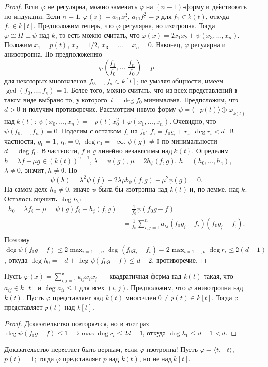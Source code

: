 \documentclass[a4paper,oneside,12pt]{article}
\theoremstyle{plain} { \swapnumbers
\newtheorem{theorem}{Теорема}[subsection]
\newtheorem{corollary}[theorem]{Следствие}
\newtheorem{lemma}[theorem]{Лемма}
\newtheorem{proposition}[theorem]{Утверждение}
\newtheorem{claim}[theorem]{Факт}
}
\theoremstyle{definition} { \swapnumbers
\newtheorem{definition}[theorem]{Определение}
\newtheorem{notation}[theorem]{Обозначение}
\newtheorem{remark}[theorem]{Замечание}
\newtheorem{remarks}[theorem]{Замечания}
\newtheorem{example}[theorem]{Пример}
\newtheorem{examples}[theorem]{Примеры}
\newtheorem{sssection}[theorem]{}
}
\def\ph{\varphi}
\def\la{\langle}
\def\ra{\rangle}
\begin{document}
\begin{proof}
Если $\ph$ не регулярна, можно заменить $\ph$ на $(n-1)$-форму и действовать по индукции.
Если $n=1$, $\ph(x)=a_{11}x_1^2$, $a_{11}f_1^2=p$ для $f_1\in k(t)$, откуда $f_1\in k[t]$.
Предположим теперь, что $\ph$ регулярна, но изотропна. Тогда $\ph\cong H\perp\psi$ над $k$,
то есть можно считать, что $\ph(x)=2x_1x_2+\psi(x_3,\dots,x_n)$. Положим $x_1=p(t)$, $x_2=1/2$,
$x_3=\dots=x_n=0$.
Наконец, $\ph$ регулярна и анизотропна. По предположению
$$
\ph\left(\frac{f_1}{f_0},\dots,\frac{f_n}{f_0}\right)=p
$$
для некоторых многочленов $f_0,\dots,f_n\in k[t]$; не умаляя общности, имеем $\gcd(f_0,\dots,f_n)=1$.
Более того, можно считать, что из всех представлений в таком виде выбрано то, у которого
$d=\deg f_0$ минимальна. Предположим, что $d>0$ и получим противоречие.
Рассмотрим новую форму $\psi=\la -p(t)\ra\oplus\ph_{k(t)}$ над $k(t)$:
$\psi(x_0,\dots,x_n)=-p(t)x_0^2+\ph(x_1,\dots,x_n)$. Очевидно,
что $\psi(f_0,\dots,f_n)=0$.
Поделим с остатком $f_i$ на $f_0$: $f_i=f_0g_i+r_i$, $\deg r_i<d$.
В частности, $g_0=1$, $r_0=0$, $\deg r_0=-\infty$.
$\psi(g)\neq 0$ по минимальности $d=\deg f_0$. В частности,
$f$ и $g$ линейно независимы над $k(t)$.
Определим $h=\lambda f-\mu g\in (k(t))^{n+1}$, $\lambda=\psi(g)$,
$\mu=2b_\psi(f,g)$. $h=(h_0,\dots,h_n)$, $\lambda\neq 0$, значит, $h\neq 0$.
Но
$$
\psi(h)=\lambda^2\psi(f)-2\lambda\mu b_\psi(f,g)+\mu^2\psi(g)=0.
$$
На самом деле $h_0\neq 0$, иначе $\psi$ была бы изотропна над $k(t)$ и,
по лемме, над $k$. Осталось оценить $\deg h_0$:
$$
\begin{aligned}
h_0=\lambda f_0-\mu=\psi(g)f_0-b_\psi(f,g)&=\frac{1}{f_0}\psi(f_0g-f)\\
&=\frac{1}{f_0}\sum_{i,j=1}^na_{ij}(f_0g_i-f_i)(f_0g_j-f_j).\\
\end{aligned}
$$
Поэтому $\deg\psi(f_0g-f)\leq 2\max_{i=1,\dots,n}\deg(f_0g_i-f_i)=2\max_{i=1,\dots,n}\deg r_i
\leq 2(d-1)$,
откуда $\deg h_0=-d+\deg\psi(f_0g-f)\leq d-2$, противоречие.
\end{proof}

\begin{theorem}[обобщение]
Пусть $\ph(x)=\sum_{i,j=1}^na_{ij}x_ix_j$~--- квадратичная форма над $k(t)$ такая, что
$a_{ij}\in k[t]$ и $\deg a_{ij}\leq 1$ для всех $(i,j)$. Предположим, что $\ph$
анизотропна над $k(t)$. Пусть $\ph$ представляет над $k(t)$ многочлен $0\neq p(t)\in k[t]$.
Тогда $\ph$ представляет $p(t)$ над $k[t]$.
\end{theorem}
\begin{proof}
Доказательство повторяется, но в этот раз $\deg\psi(f_0g-f)\leq 1+2\max\deg r_i\leq 2d-1$,
откуда $\deg h_0\leq d-1<d$.
\end{proof}
\begin{remark}
Доказательство перестает быть верным, если $\ph$ изотропна! Пусть $\ph=\la t,-t\ra$, $p(t)=1$;
тогда $\ph$ представляет $p$ над $k(t)$, но не над $k[t]$.
\end{remark}
\end{document}

